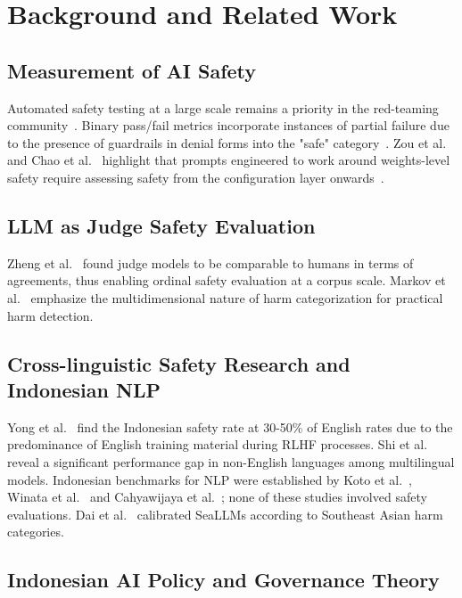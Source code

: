﻿\documentclass[conference]{IEEEtran}
\begin{document}
\section{Background and Related Work}

\subsection{Measurement of AI Safety}

Automated safety testing at a large scale remains a priority in the red-teaming community~\cite{b1,b17}. Binary pass/fail metrics incorporate instances of partial failure due to the presence of guardrails in denial forms into the "safe" category~\cite{b3,b18}. Zou et al.~\cite{b19} and Chao et al.~\cite{b20} highlight that prompts engineered to work around weights-level safety require assessing safety from the configuration layer onwards~\cite{b4}.

\subsection{LLM as Judge Safety Evaluation}

Zheng et al.~\cite{b21} found judge models to be comparable to humans in terms of agreements, thus enabling ordinal safety evaluation at a corpus scale. Markov et al.~\cite{b22} emphasize the multidimensional nature of harm categorization for practical harm detection.

\subsection{Cross-linguistic Safety Research and Indonesian NLP}

Yong et al.~\cite{b5} find the Indonesian safety rate at 30-50\% of English rates due to the predominance of English training material during RLHF processes. Shi et al.~\cite{b6} reveal a significant performance gap in non-English languages among multilingual models. Indonesian benchmarks for NLP were established by Koto et al.~\cite{b32}, Winata et al.~\cite{b33} and Cahyawijaya et al.~\cite{b34}; none of these studies involved safety evaluations. Dai et al.~\cite{b31} calibrated SeaLLMs according to Southeast Asian harm categories.

\subsection{Indonesian AI Policy and Governance Theory}
\end{document}
